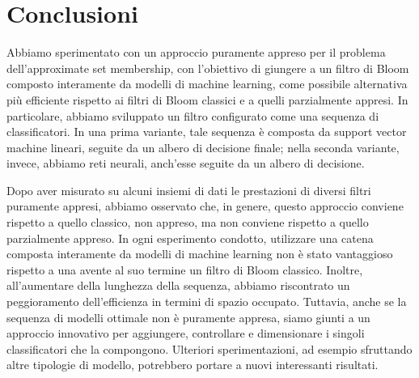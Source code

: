 \chapter{Conclusioni}

Abbiamo sperimentato con un approccio puramente appreso per il problema dell'approximate set membership, con l'obiettivo di giungere a un filtro di Bloom composto interamente da modelli di machine learning, come possibile alternativa più efficiente rispetto ai filtri di Bloom classici e a quelli parzialmente appresi. In particolare, abbiamo sviluppato un filtro configurato come una sequenza di classificatori. In una prima variante, tale sequenza è composta da support vector machine lineari, seguite da un albero di decisione finale; nella seconda variante, invece, abbiamo reti neurali, anch'esse seguite da un albero di decisione. 

Dopo aver misurato su alcuni insiemi di dati le prestazioni di diversi filtri puramente appresi, abbiamo osservato che, in genere, questo approccio conviene rispetto a quello classico, non appreso, ma non conviene rispetto a quello parzialmente appreso. 
In ogni esperimento condotto, utilizzare una catena composta interamente da modelli di machine learning non è stato vantaggioso rispetto a una avente al suo termine un filtro di Bloom classico. Inoltre, all'aumentare della lunghezza della sequenza, abbiamo riscontrato un peggioramento dell'efficienza in termini di spazio occupato. 
Tuttavia, anche se la sequenza di modelli ottimale non è puramente appresa, siamo giunti a un approccio innovativo per aggiungere, controllare e dimensionare i singoli classificatori che la compongono. Ulteriori sperimentazioni, ad esempio sfruttando altre tipologie di modello, potrebbero portare a nuovi interessanti risultati. 